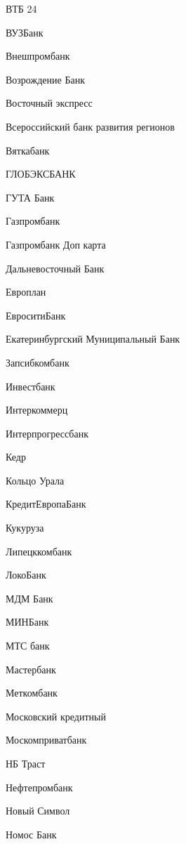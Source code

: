 \documentclass[a4paper,10pt,russian]{sphinxmanual}
\begin{document}
\sphinxAtStartPar
ВТБ 24

\sphinxAtStartPar
ВУЗ\sphinxhyphen{}Банк

\sphinxAtStartPar
Внешпромбанк

\sphinxAtStartPar
Возрождение Банк

\sphinxAtStartPar
Восточный экспресс

\sphinxAtStartPar
Всероссийский банк развития регионов

\sphinxAtStartPar
Вятка\sphinxhyphen{}банк

\sphinxAtStartPar
ГЛОБЭКСБАНК

\sphinxAtStartPar
ГУТА Банк

\sphinxAtStartPar
Газпромбанк

\sphinxAtStartPar
Газпромбанк Доп карта

\sphinxAtStartPar
Дальневосточный Банк

\sphinxAtStartPar
Европлан

\sphinxAtStartPar
ЕвроситиБанк

\sphinxAtStartPar
Екатеринбургский Муниципальный Банк

\sphinxAtStartPar
Запсибкомбанк

\sphinxAtStartPar
Инвестбанк

\sphinxAtStartPar
Интеркоммерц

\sphinxAtStartPar
Интерпрогрессбанк

\sphinxAtStartPar
Кедр

\sphinxAtStartPar
Кольцо Урала

\sphinxAtStartPar
КредитЕвропаБанк

\sphinxAtStartPar
Кукуруза

\sphinxAtStartPar
Липецккомбанк

\sphinxAtStartPar
ЛокоБанк

\sphinxAtStartPar
МДМ Банк

\sphinxAtStartPar
МИНБанк

\sphinxAtStartPar
МТС банк

\sphinxAtStartPar
Мастербанк

\sphinxAtStartPar
Меткомбанк

\sphinxAtStartPar
Московский кредитный

\sphinxAtStartPar
Москомприватбанк

\sphinxAtStartPar
НБ Траст

\sphinxAtStartPar
Нефтепромбанк

\sphinxAtStartPar
Новый Символ

\sphinxAtStartPar
Номос Банк
\end{document}
